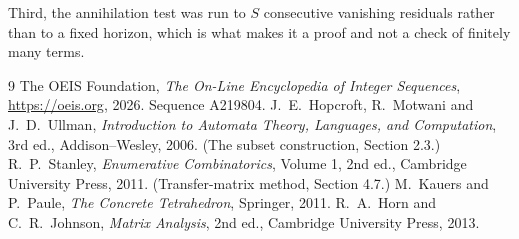 \documentclass[11pt,a4paper]{article}
\theoremstyle{plain}
\theoremstyle{definition}
\begin{document}
Third, the annihilation test was run to $S$ consecutive vanishing residuals rather than to a
fixed horizon, which is what makes it a proof and not a check of finitely many terms.

\begin{thebibliography}{9}
 The OEIS Foundation, \emph{The On-Line Encyclopedia of Integer
Sequences}, \url{https://oeis.org}, 2026. Sequence A219804.
 J.~E.~Hopcroft, R.~Motwani and J.~D.~Ullman, \emph{Introduction to Automata
Theory, Languages, and Computation}, 3rd ed., Addison--Wesley, 2006. (The subset
construction, Section 2.3.)
 R.~P.~Stanley, \emph{Enumerative Combinatorics}, Volume 1, 2nd ed.,
Cambridge University Press, 2011. (Transfer-matrix method, Section 4.7.)
 M.~Kauers and P.~Paule, \emph{The Concrete Tetrahedron}, Springer, 2011.
 R.~A.~Horn and C.~R.~Johnson, \emph{Matrix Analysis}, 2nd ed., Cambridge
University Press, 2013.
\end{thebibliography}
\end{document}
